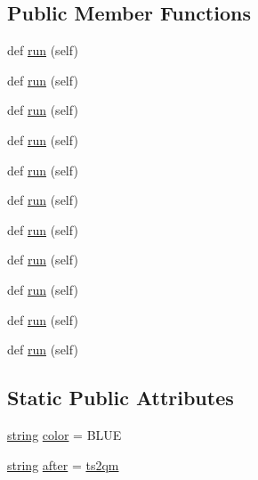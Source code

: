 \subsection*{Public Member Functions}
\begin{DoxyCompactItemize}
\item 
def \hyperlink{classwaflib_1_1_tools_1_1qt4_1_1qm2rcc_ab1c0d29ea939b55d544105a9fad18a9c}{run} (self)
\item 
def \hyperlink{classwaflib_1_1_tools_1_1qt4_1_1qm2rcc_ab1c0d29ea939b55d544105a9fad18a9c}{run} (self)
\item 
def \hyperlink{classwaflib_1_1_tools_1_1qt4_1_1qm2rcc_ab1c0d29ea939b55d544105a9fad18a9c}{run} (self)
\item 
def \hyperlink{classwaflib_1_1_tools_1_1qt4_1_1qm2rcc_ab1c0d29ea939b55d544105a9fad18a9c}{run} (self)
\item 
def \hyperlink{classwaflib_1_1_tools_1_1qt4_1_1qm2rcc_ab1c0d29ea939b55d544105a9fad18a9c}{run} (self)
\item 
def \hyperlink{classwaflib_1_1_tools_1_1qt4_1_1qm2rcc_ab1c0d29ea939b55d544105a9fad18a9c}{run} (self)
\item 
def \hyperlink{classwaflib_1_1_tools_1_1qt4_1_1qm2rcc_ab1c0d29ea939b55d544105a9fad18a9c}{run} (self)
\item 
def \hyperlink{classwaflib_1_1_tools_1_1qt4_1_1qm2rcc_ab1c0d29ea939b55d544105a9fad18a9c}{run} (self)
\item 
def \hyperlink{classwaflib_1_1_tools_1_1qt4_1_1qm2rcc_ab1c0d29ea939b55d544105a9fad18a9c}{run} (self)
\item 
def \hyperlink{classwaflib_1_1_tools_1_1qt4_1_1qm2rcc_ab1c0d29ea939b55d544105a9fad18a9c}{run} (self)
\item 
def \hyperlink{classwaflib_1_1_tools_1_1qt4_1_1qm2rcc_ab1c0d29ea939b55d544105a9fad18a9c}{run} (self)
\end{DoxyCompactItemize}
\subsection*{Static Public Attributes}
\begin{DoxyCompactItemize}
\item 
\hyperlink{test__lib_f_l_a_c_2format_8c_ab02026ad0de9fb6c1b4233deb0a00c75}{string} \hyperlink{classwaflib_1_1_tools_1_1qt4_1_1qm2rcc_a9f66baeef0af6fb62b4f2af2fb002742}{color} = \textquotesingle{}B\+L\+UE\textquotesingle{}
\item 
\hyperlink{test__lib_f_l_a_c_2format_8c_ab02026ad0de9fb6c1b4233deb0a00c75}{string} \hyperlink{classwaflib_1_1_tools_1_1qt4_1_1qm2rcc_a0247989000278ea986ad6952cf39fe14}{after} = \textquotesingle{}\hyperlink{classwaflib_1_1_tools_1_1qt4_1_1ts2qm}{ts2qm}\textquotesingle{}
\end{DoxyCompactItemize}
